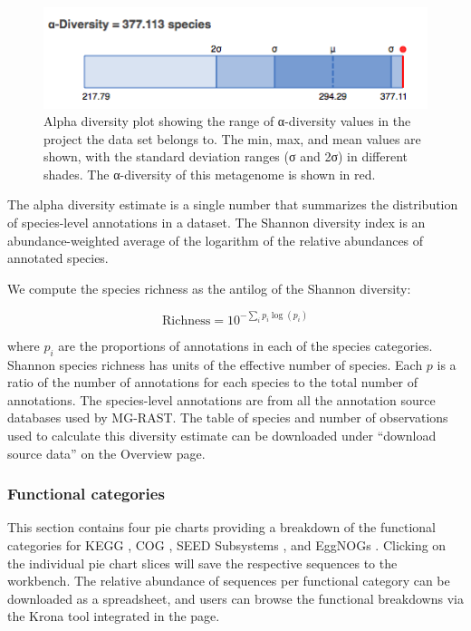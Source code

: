 \documentclass[12pt,fullpage]{report}
\begin{document}
\begin{figure}
\begin{center}
\includegraphics[width=6in]{Images/alpha-diversity.png}
\end{center}
\caption{
Alpha diversity plot showing the range of α-diversity values in the project the data set belongs to. The min, max, and mean values are shown, with the standard deviation ranges (σ and 2σ) in different shades. The α-diversity of this metagenome is shown in red.
}
\label{fig:alpha-diversity}
\end{figure}


The alpha diversity estimate is a single number that summarizes the distribution of species-level annotations in a dataset.   The Shannon diversity index is an abundance-weighted average of the logarithm of the relative abundances of annotated species.

We compute the species richness as the antilog of the Shannon diversity:

$$ \textrm{Richness} = 10^{-\sum_i  p_i \log(p_i) }  $$

\noindent
where $p_i$ are the proportions of annotations in each of the species categories.
Shannon species richness
has units of  the effective number of species. Each $p$ is a ratio of the number of annotations for each species to the total number of annotations.
The species-level annotations are from all the annotation source databases used by MG-RAST. The table of species and number of observations used to calculate this diversity estimate can be downloaded under ``download source data'' on the Overview page.
\subsubsection{Functional categories}

This section contains four pie charts providing a breakdown of the functional categories for KEGG \cite{KEGG}, COG \cite{COG}, \gls{SEED} \gls{Subsystem}s \cite{SUBSYSTEMS}, and EggNOGs \cite{EGGNOG}. Clicking on the individual pie chart slices will save the respective sequences to the workbench.
The relative abundance of sequences per functional category can be downloaded as a spreadsheet, and users can browse the functional breakdowns via the Krona tool \cite{KRONA}integrated in the page.
\end{document}
